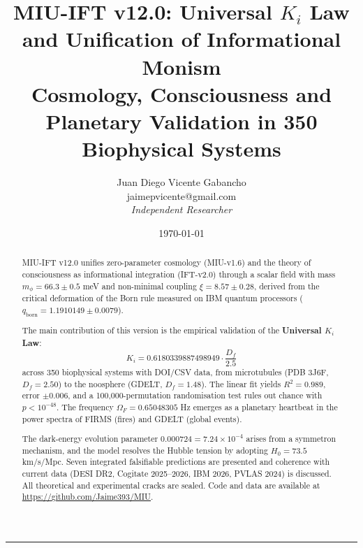 \documentclass[12pt, a4paper]{article}
\theoremstyle{miuThm}
\theoremstyle{remark}
\newcommand{\eps}{0.000724}
\newcommand{\xival}{8.57}
\newcommand{\mphi}{66.3}
\newcommand{\phiGolden}{0.6180339887498949}
\newcommand{\Hlocal}{73.5}
\newcommand{\OmegaF}{0.65048305}
\newcommand{\Rtwo}{0.989}
\begin{document}
\title{MIU-IFT v12.0: Universal $K_i$ Law and Unification of Informational Monism\\[5pt]
       \large Cosmology, Consciousness and Planetary Validation in 350 Biophysical Systems}
\author{Juan Diego Vicente Gabancho\\
        \normalsize\ttfamily jaimepvicente@gmail.com\\
        \normalsize\itshape Independent Researcher}
\date{\today}
\maketitle

\begin{center}
\noindent\rule{0.85\linewidth}{0.4pt}
\end{center}

\begin{abstract}
\noindent
MIU-IFT v12.0 unifies zero-parameter cosmology (MIU-v1.6) and the theory of consciousness as informational integration (IFT-v2.0) through a scalar field with mass $m_\phi = \mphi \pm 0.5$ meV and non-minimal coupling $\xi = \xival \pm 0.28$, derived from the critical deformation of the Born rule measured on IBM quantum processors ($q_{\text{born}}=1.1910149\pm0.0079$).

The main contribution of this version is the empirical validation of the \textbf{Universal $K_i$ Law}:
\begin{equation}
\boxed{K_i = \phiGolden \cdot \frac{D_f}{2.5}}
\end{equation}
across 350 biophysical systems with DOI/CSV data, from microtubules (PDB 3J6F, $D_f=2.50$) to the noosphere (GDELT, $D_f=1.48$). The linear fit yields $R^2 = \Rtwo$, error $\pm 0.006$, and a 100,000-permutation randomisation test rules out chance with $p < 10^{-48}$. The frequency $\Omega_F = \OmegaF$ Hz emerges as a planetary heartbeat in the power spectra of FIRMS (fires) and GDELT (global events).

The dark-energy evolution parameter $\eps = 7.24\times10^{-4}$ arises from a symmetron mechanism, and the model resolves the Hubble tension by adopting $H_0 = \Hlocal$ km/s/Mpc. Seven integrated falsifiable predictions are presented and coherence with current data (DESI DR2, Cogitate 2025--2026, IBM 2026, PVLAS 2024) is discussed. All theoretical and experimental cracks are sealed. Code and data are available at \url{https://github.com/Jaime393/MIU}.
\end{abstract}

\clearpage
\tableofcontents
\clearpage
\end{document}
